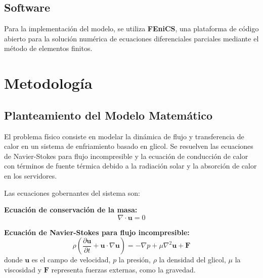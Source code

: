 \documentclass[12pt, a4paper]{article}
\begin{document}
\subsection*{Software}
Para la implementación del modelo, se utiliza \textbf{FEniCS}, una plataforma de código abierto para la solución numérica de ecuaciones diferenciales parciales mediante el método de elementos finitos.


\newpage
\section{Metodología}

\subsection*{Planteamiento del Modelo Matemático}

El problema físico consiste en modelar la dinámica de flujo y transferencia de calor en un sistema de enfriamiento basado en glicol. Se resuelven las ecuaciones de Navier-Stokes para flujo incompresible y la ecuación de conducción de calor con términos de fuente térmica debido a la radiación solar y la absorción de calor en los servidores.

Las ecuaciones gobernantes del sistema son:

\textbf{Ecuación de conservación de la masa:}
\begin{equation}
\nabla \cdot \mathbf{u} = 0
\end{equation}

\textbf{Ecuación de Navier-Stokes para flujo incompresible:}
\begin{equation}
\rho \left( \frac{\partial \mathbf{u}}{\partial t} + \mathbf{u} \cdot \nabla \mathbf{u} \right) = -\nabla p + \mu \nabla^2 \mathbf{u} + \mathbf{F}
\end{equation}
donde $\mathbf{u}$ es el campo de velocidad, $p$ la presión, $\rho$ la densidad del glicol, $\mu$ la viscosidad y $\mathbf{F}$ representa fuerzas externas, como la gravedad.
\end{document}
